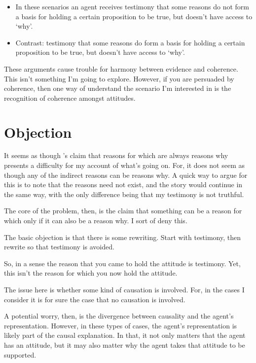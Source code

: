\documentclass[10pt]{article}
\begin{document}
\begin{itemize}
\item In these scenarios an agent receives testimony that some reasons do not form a basis for holding a certain proposition to be true, but doesn't have access to `why'.
\item Contrast: testimony that some reasons do form a basis for holding a certain proposition to be true, but doesn't have access to `why'.
\end{itemize}

These arguments cause trouble for harmony between evidence and coherence.
This isn't something I'm going to explore.
However, if you are persuaded by coherence, then one way of understand the scenario I'm interested in is the recognition of coherence amongst attitudes.


\section{Objection}
\label{sec:objection}

It seems as though \citeauthor{Neta:2019aa}'s claim that reasons for which are always reasons why presents a difficulty for my account of what's going on.
For, it does not seem as though any of the indirect reasons can be reasons why.
A quick way to argue for this is to note that the reasons need not exist, and the story would continue in the same way, with the only difference being that my testimony is not truthful.

The core of the problem, then, is the claim that something can be a reason for which only if it can also be a reason why.
I sort of deny this.

The basic objection is that there is some rewriting.
Start with testimony, then rewrite so that testimony is avoided.

So, in a sense the reason that you came to hold the attitude is testimony.
Yet, this isn't the reason for which you now hold the attitude.

The issue here is whether some kind of causation is involved.
For, in the cases I consider it is for sure the case that no causation is involved.

A potential worry, then, is the divergence between causality and the agent's representation.
However, in these types of cases, the agent's representation is likely part of the causal explanation.
In that, it not only matters that the agent has an attitude, but it may also matter why the agent takes that attitude to be supported.
\end{document}

